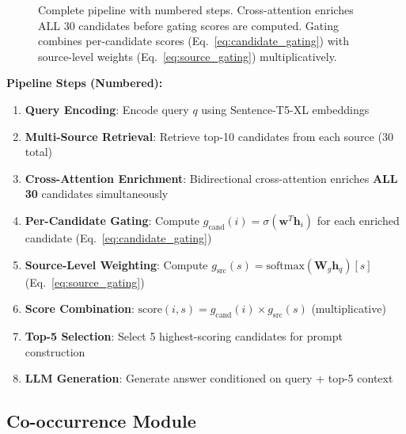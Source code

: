 \documentclass[10pt,twocolumn]{article}
\begin{document}
\begin{figure}[t]
\caption{Complete pipeline with numbered steps. Cross-attention enriches ALL 30 candidates before gating scores are computed. Gating combines per-candidate scores (Eq.~\ref{eq:candidate_gating}) with source-level weights (Eq.~\ref{eq:source_gating}) multiplicatively.}
\label{fig:pipeline}
\end{figure}

\textbf{Pipeline Steps (Numbered):}
\begin{enumerate}
    \item \textbf{Query Encoding}: Encode query $q$ using Sentence-T5-XL embeddings
    \item \textbf{Multi-Source Retrieval}: Retrieve top-10 candidates from each source (30 total)
    \item \textbf{Cross-Attention Enrichment}: Bidirectional cross-attention enriches \textbf{ALL 30} candidates simultaneously
    \item \textbf{Per-Candidate Gating}: Compute $g_{\text{cand}}(i) = \sigma(\mathbf{w}^T \mathbf{h}_i)$ for each enriched candidate (Eq.~\ref{eq:candidate_gating})
    \item \textbf{Source-Level Weighting}: Compute $g_{\text{src}}(s) = \text{softmax}(\mathbf{W}_g \mathbf{h}_q)[s]$ (Eq.~\ref{eq:source_gating})
    \item \textbf{Score Combination}: $\text{score}(i,s) = g_{\text{cand}}(i) \times g_{\text{src}}(s)$ (multiplicative)
    \item \textbf{Top-5 Selection}: Select 5 highest-scoring candidates for prompt construction
    \item \textbf{LLM Generation}: Generate answer conditioned on query + top-5 context
\end{enumerate}


\subsection{Co-occurrence Module}
\end{document}
